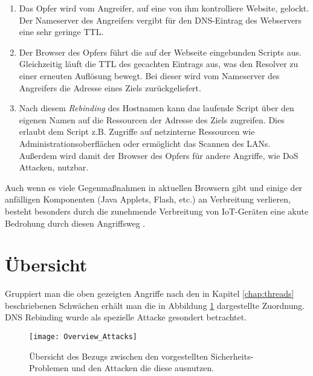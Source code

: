 \begin{enumerate}[topsep=0pt,itemsep=-1ex,partopsep=1ex,parsep=1ex]
    \item Das Opfer wird vom Angreifer, auf eine von ihm kontrolliere Website, gelockt. Der Nameserver des Angreifers vergibt für den DNS-Eintrag des Webservers eine sehr geringe TTL.
    \item Der Browser des Opfers führt die auf der Webseite eingebunden Scripts aus. Gleichzeitig läuft die TTL des gecachten Eintrags aus, was den Resolver zu einer erneuten Auflösung bewegt. Bei dieser wird vom Nameserver des Angreifers die Adresse eines Ziels zurückgeliefert.
    \item Nach diesem \textit{Rebinding} des Hostnamen kann das laufende Script über den eigenen Namen auf die Ressourcen der Adresse des Ziels zugreifen. Dies erlaubt dem Script z.B. Zugriffe auf netzinterne Ressourcen wie Administrationsoberflächen oder ermöglicht das Scannen des LANs. Außerdem wird damit der Browser des Opfers für andere Angriffe, wie \ac{DoS} Attacken, nutzbar.   
\end{enumerate}

Auch wenn es viele Gegenmaßnahmen in aktuellen Browsern gibt und einige der anfälligen Komponenten (Java Applets, Flash, etc.) an Verbreitung verlieren, besteht besonders durch die zunehmende Verbreitung von IoT-Geräten eine akute Bedrohung durch diesen Angriffsweg \cite{Dorsey2018}. 

\section{Übersicht}
Gruppiert man die oben gezeigten Angriffe nach den in Kapitel \ref{chap:threads} beschriebenen Schwächen erhält man die in Abbildung \ref{img:attacks-summary} dargestellte Zuordnung. DNS Rebinding wurde als spezielle Attacke gesondert betrachtet.

\begin{figure}[!hb]
    \centering
    \texttt{[image: Overview\_Attacks]}
    \caption{Übersicht des Bezugs zwischen den vorgestellten Sicherheits-Problemen und den Attacken die diese ausnutzen.}
    \label{img:attacks-summary}
\end{figure}

